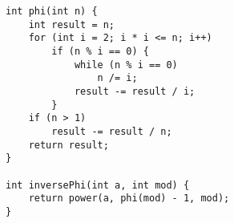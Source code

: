 \begin{verbatim}
int phi(int n) {
	int result = n;
	for (int i = 2; i * i <= n; i++)
		if (n % i == 0) {
			while (n % i == 0)
				n /= i;
			result -= result / i;
		}
	if (n > 1)
		result -= result / n;
	return result;
}

int inversePhi(int a, int mod) {
	return power(a, phi(mod) - 1, mod);
}
\end{verbatim}
